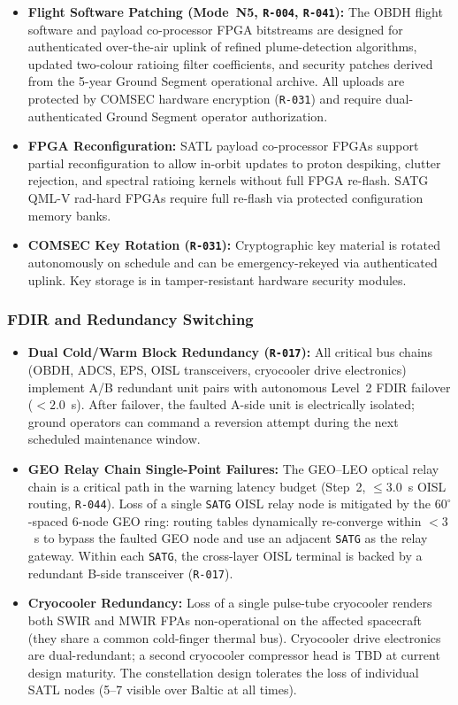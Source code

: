 \begin{itemize}
    \item \textbf{Flight Software Patching (Mode~N5, \texttt{R-004}, \texttt{R-041}):} The OBDH flight software and payload co-processor FPGA bitstreams are designed for authenticated over-the-air uplink of refined plume-detection algorithms, updated two-colour ratioing filter coefficients, and security patches derived from the 5-year Ground Segment operational archive. All uploads are protected by COMSEC hardware encryption (\texttt{R-031}) and require dual-authenticated Ground Segment operator authorization.
    \item \textbf{FPGA Reconfiguration:} SATL payload co-processor FPGAs support partial reconfiguration to allow in-orbit updates to proton despiking, clutter rejection, and spectral ratioing kernels without full FPGA re-flash. SATG QML-V rad-hard FPGAs require full re-flash via protected configuration memory banks.
    \item \textbf{COMSEC Key Rotation (\texttt{R-031}):} Cryptographic key material is rotated autonomously on schedule and can be emergency-rekeyed via authenticated uplink. Key storage is in tamper-resistant hardware security modules.
\end{itemize}

\subsubsection{FDIR and Redundancy Switching}

\begin{itemize}
    \item \textbf{Dual Cold/Warm Block Redundancy (\texttt{R-017}):} All critical bus chains (OBDH, ADCS, EPS, OISL transceivers, cryocooler drive electronics) implement A/B redundant unit pairs with autonomous Level~2 FDIR failover ($< 2.0$~s). After failover, the faulted A-side unit is electrically isolated; ground operators can command a reversion attempt during the next scheduled maintenance window.
    \item \textbf{GEO Relay Chain Single-Point Failures:} The GEO--LEO optical relay chain is a critical path in the warning latency budget (Step~2, $\le 3.0$~s OISL routing, \texttt{R-044}). Loss of a single \texttt{SATG} OISL relay node is mitigated by the $60^\circ$-spaced 6-node GEO ring: routing tables dynamically re-converge within $< 3$~s to bypass the faulted GEO node and use an adjacent \texttt{SATG} as the relay gateway. Within each \texttt{SATG}, the cross-layer OISL terminal is backed by a redundant B-side transceiver (\texttt{R-017}).
    \item \textbf{Cryocooler Redundancy:} Loss of a single pulse-tube cryocooler renders both SWIR and MWIR FPAs non-operational on the affected spacecraft (they share a common cold-finger thermal bus). Cryocooler drive electronics are dual-redundant; a second cryocooler compressor head is TBD at current design maturity. The constellation design tolerates the loss of individual SATL nodes (5--7 visible over Baltic at all times).
\end{itemize}

